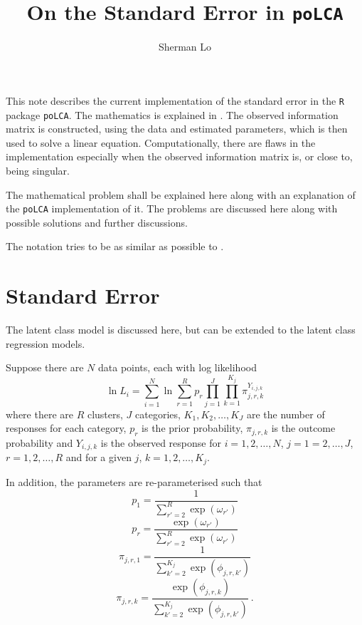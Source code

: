 \documentclass{article}
\title{On the Standard Error in \texttt{poLCA}}
\author{Sherman Lo}
\date{}
\begin{document}
\maketitle

This note describes the current implementation of the standard error in the \texttt{R} package \texttt{poLCA}. The mathematics is explained in \cite{JSSv042i10}. The observed information matrix is constructed, using the data and estimated parameters, which is then used to solve a linear equation. Computationally, there are flaws in the implementation especially when the observed information matrix is, or close to, being singular.

The mathematical problem shall be explained here along with an explanation of the \texttt{poLCA} implementation of it. The problems are discussed here along with possible solutions and further discussions.

The notation tries to be as similar as possible to \cite{JSSv042i10}.

\section{Standard Error}

The latent class model is discussed here, but can be extended to the latent class regression models.

Suppose there are $N$ data points, each with log likelihood
\begin{equation}
    \ln L_i = \sum_{i=1}^N \ln \sum_{r=1}^R p_r \prod_{j=1}^J \prod_{k=1}^{K_j} \pi_{j,r,k}^{Y_{i,j,k}}
\end{equation}
where there are $R$ clusters, $J$ categories, $K_1, K_2,\ldots,K_J$ are the number of responses for each category, $p_r$ is the prior probability, $\pi_{j,r,k}$ is the outcome probability and $Y_{i,j,k}$ is the observed response for $i=1,2,\ldots,N$, $j=1=2,\ldots,J$, $r=1,2,\ldots,R$ and for a given $j$, $k=1,2,\ldots,K_j$.

In addition, the parameters are re-parameterised such that
\begin{equation}
    p_1 = \dfrac{1}{\sum_{r'=2}^R \exp(\omega_{r'})}
\end{equation}
\begin{equation}
    p_r = \dfrac{\exp(\omega_{r'})}{\sum_{r'=2}^R \exp(\omega_{r'})}
\end{equation}
\begin{equation}
    \pi_{j,r,1} = \dfrac{1}{\sum_{k'=2}^{K_j} \exp(\phi_{j,r,k'})}
\end{equation}
\begin{equation}
    \pi_{j,r,k} = \dfrac{\exp(\phi_{j,r,k})}{\sum_{k'=2}^{K_j} \exp(\phi_{j,r,k'})}
    \ .
\end{equation}
\end{document}
